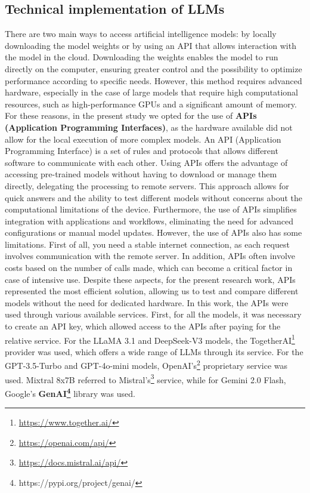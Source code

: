 \subsection{Technical implementation of LLMs}
There are two main ways to access artificial intelligence models: by locally downloading the model weights or by using an API that allows interaction with the model in the cloud. Downloading the weights enables the model to run directly on the computer, ensuring greater control and the possibility to optimize performance according to specific needs. However, this method requires advanced hardware, especially in the case of large models that require high computational resources, such as high-performance GPUs and a significant amount of memory.
For these reasons, in the present study we opted for the use of \textbf{APIs (Application Programming Interfaces)}, as the hardware available did not allow for the local execution of more complex models. An API (Application Programming Interface) is a set of rules and protocols that allows different software to communicate with each other. Using APIs offers the advantage of accessing pre-trained models without having to download or manage them directly, delegating the processing to remote servers. This approach allows for quick answers and the ability to test different models without concerns about the computational limitations of the device. Furthermore, the use of APIs simplifies integration with applications and workflows, eliminating the need for advanced configurations or manual model updates.
However, the use of APIs also has some limitations. First of all, you need a stable internet connection, as each request involves communication with the remote server. In addition, APIs often involve costs based on the number of calls made, which can become a critical factor in case of intensive use. Despite these aspects, for the present research work, APIs represented the most efficient solution, allowing us to test and compare different models without the need for dedicated hardware.
In this work, the APIs were used through various available services. First, for all the models, it was necessary to create an API key, which allowed access to the APIs after paying for the relative service.
For the LLaMA 3.1 and DeepSeek-V3 models, the TogetherAI\footnote{\url{https://www.together.ai/}} provider was used, which offers a wide range of LLMs through its service.
For the GPT-3.5-Turbo and GPT-4o-mini models, OpenAI's\footnote{\url{https://openai.com/api/}} proprietary service was used.
Mixtral 8x7B referred to Mistral's\footnote{\url{https://docs.mistral.ai/api/}} service,  while for Gemini 2.0 Flash, Google's \textbf{GenAI\footnote{https://pypi.org/project/genai/}} library was used.
\\

